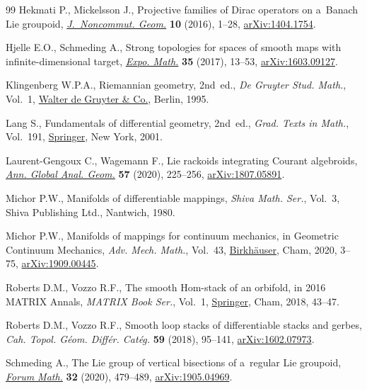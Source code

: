 \documentclass[pdftex]{sigma}
\numberwithin{equation}{section}
\begin{document}
\begin{thebibliography}{99}
Hekmati P., Mickelsson J., Projective families of {D}irac operators on
 a~{B}anach {L}ie groupoid,
 \href{https://doi.org/10.4171/JNCG/227}{\textit{J.~Noncommut. Geom.}}
 \textbf{10} (2016), 1--28,
 \href{http://arxiv.org/abs/1404.1754}{arXiv:1404.1754}.

Hjelle E.O., Schmeding A., Strong topologies for spaces of smooth maps with
 infinite-dimensional target,
 \href{https://doi.org/10.1016/j.exmath.2016.07.004}{\textit{Expo. Math.}}
 \textbf{35} (2017), 13--53,
 \href{http://arxiv.org/abs/1603.09127}{arXiv:1603.09127}.

Klingenberg W.P.A., Riemannian geometry, 2nd~ed., \textit{De Gruyter Stud. Math.},
 Vol.~1, \href{https://doi.org/10.1515/9783110905120}{Walter de
 Gruyter \& Co.}, Berlin, 1995.

Lang S., Fundamentals of differential geometry, 2nd~ed., \textit{Grad. Texts in Math.},
 Vol.~191, \href{https://doi.org/10.1007/978-1-4612-0541-8}{Springer}, New
 York, 2001.

Laurent-Gengoux C., Wagemann F., Lie rackoids integrating {C}ourant algebroids,
 \href{https://doi.org/10.1007/s10455-019-09697-2}{\textit{Ann. Global Anal.
 Geom.}} \textbf{57} (2020), 225--256,
 \href{http://arxiv.org/abs/1807.05891}{arXiv:1807.05891}.

Michor P.W., Manifolds of differentiable mappings, \textit{Shiva Math. Ser.},
 Vol.~3, Shiva Publishing Ltd., Nantwich, 1980.

Michor P.W., Manifolds of mappings for continuum mechanics, in Geometric
 Continuum Mechanics, \textit{Adv. Mech. Math.}, Vol.~43,
 \href{https://doi.org/10.1007/978-3-030-42683-5_1}{Birkh\"auser}, Cham, 2020,
 3--75, \href{http://arxiv.org/abs/1909.00445}{arXiv:1909.00445}.

Roberts D.M., Vozzo R.F., The smooth {H}om-stack of an orbifold, in 2016
 {MATRIX} Annals, \textit{MATRIX Book Ser.}, Vol.~1,
 \href{https://doi.org/10.1007/978-3-319-72299-3_3}{Springer}, Cham, 2018,
 43--47.

Roberts D.M., Vozzo R.F., Smooth loop stacks of differentiable stacks and
 gerbes, \textit{Cah. Topol. G\'eom. Diff\'er. Cat\'eg.} \textbf{59} (2018),
 95--141, \href{http://arxiv.org/abs/1602.07973}{arXiv:1602.07973}.

Schmeding A., The {L}ie group of vertical bisections of a~regular {L}ie
 groupoid, \href{https://doi.org/10.1515/forum-2019-0128}{\textit{Forum
 Math.}} \textbf{32} (2020), 479--489,
 \href{http://arxiv.org/abs/1905.04969}{arXiv:1905.04969}.


\end{thebibliography}
\end{document}
